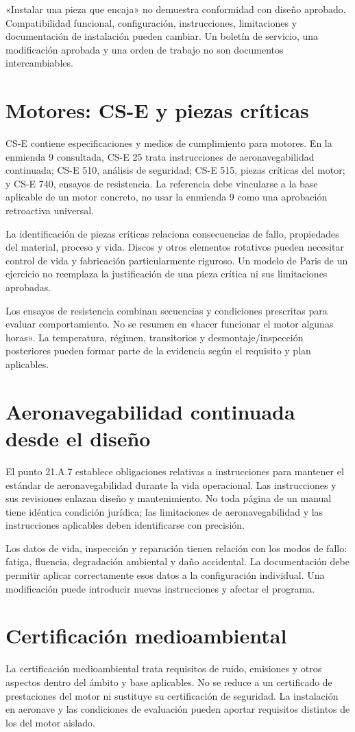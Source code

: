 «Instalar una pieza que encaja» no demuestra conformidad con diseño aprobado. Compatibilidad funcional, configuración, instrucciones, limitaciones y documentación de instalación pueden cambiar. Un boletín de servicio, una modificación aprobada y una orden de trabajo no son documentos intercambiables.
\section{Motores: CS-E y piezas críticas}
CS-E contiene especificaciones y medios de cumplimiento para motores. En la enmienda 9 consultada, CS-E 25 trata instrucciones de aeronavegabilidad continuada; CS-E 510, análisis de seguridad; CS-E 515, piezas críticas del motor; y CS-E 740, ensayos de resistencia. La referencia debe vincularse a la base aplicable de un motor concreto, no usar la enmienda 9 como una aprobación retroactiva universal.

La identificación de piezas críticas relaciona consecuencias de fallo, propiedades del material, proceso y vida. Discos y otros elementos rotativos pueden necesitar control de vida y fabricación particularmente riguroso. Un modelo de Paris de un ejercicio no reemplaza la justificación de una pieza crítica ni sus limitaciones aprobadas.

Los ensayos de resistencia combinan secuencias y condiciones prescritas para evaluar comportamiento. No se resumen en «hacer funcionar el motor algunas horas». La temperatura, régimen, transitorios y desmontaje/inspección posteriores pueden formar parte de la evidencia según el requisito y plan aplicables.
\section{Aeronavegabilidad continuada desde el diseño}
El punto 21.A.7 establece obligaciones relativas a instrucciones para mantener el estándar de aeronavegabilidad durante la vida operacional. Las instrucciones y sus revisiones enlazan diseño y mantenimiento. No toda página de un manual tiene idéntica condición jurídica; las limitaciones de aeronavegabilidad y las instrucciones aplicables deben identificarse con precisión.

Los datos de vida, inspección y reparación tienen relación con los modos de fallo: fatiga, fluencia, degradación ambiental y daño accidental. La documentación debe permitir aplicar correctamente esos datos a la configuración individual. Una modificación puede introducir nuevas instrucciones y afectar el programa.
\section{Certificación medioambiental}
La certificación medioambiental trata requisitos de ruido, emisiones y otros aspectos dentro del ámbito y base aplicables. No se reduce a un certificado de prestaciones del motor ni sustituye su certificación de seguridad. La instalación en aeronave y las condiciones de evaluación pueden aportar requisitos distintos de los del motor aislado.

